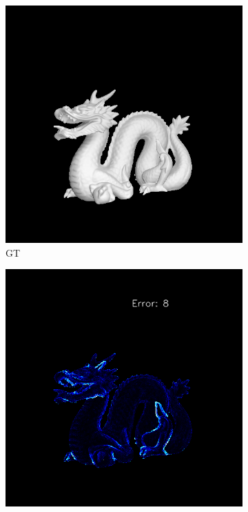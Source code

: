 \begin{figure}[H]
	
	\begin{subfigure}[b]{0.24\linewidth}
		\includegraphics[width=\linewidth]{./Figures/comparison_512/fancy_eval_14_img.png}
		\caption{GT}
	\end{subfigure}
	\begin{subfigure}[b]{0.24\linewidth}
		\includegraphics[width=\linewidth]{./Figures/comparison_512/fancy_eval_14_error_SVD.png}

\end{subfigure}
\end{figure}
